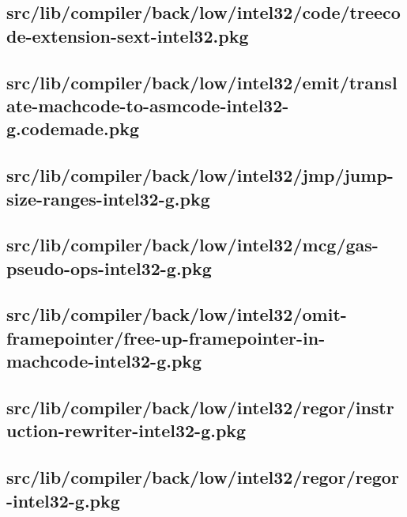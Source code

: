 \subsection{src/lib/compiler/back/low/intel32/code/treecode-extension-sext-intel32.pkg}


\subsection{src/lib/compiler/back/low/intel32/emit/translate-machcode-to-asmcode-intel32-g.codemade.pkg}


\subsection{src/lib/compiler/back/low/intel32/jmp/jump-size-ranges-intel32-g.pkg}


\subsection{src/lib/compiler/back/low/intel32/mcg/gas-pseudo-ops-intel32-g.pkg}


\subsection{src/lib/compiler/back/low/intel32/omit-framepointer/free-up-framepointer-in-machcode-intel32-g.pkg}


\subsection{src/lib/compiler/back/low/intel32/regor/instruction-rewriter-intel32-g.pkg}


\subsection{src/lib/compiler/back/low/intel32/regor/regor-intel32-g.pkg}


